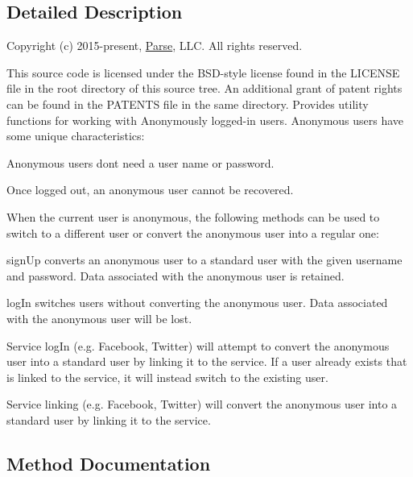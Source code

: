 \subsection{Detailed Description}
Copyright (c) 2015-\/present, \hyperlink{interface_parse}{Parse}, L\+L\+C. All rights reserved.

This source code is licensed under the B\+S\+D-\/style license found in the L\+I\+C\+E\+N\+S\+E file in the root directory of this source tree. An additional grant of patent rights can be found in the P\+A\+T\+E\+N\+T\+S file in the same directory. Provides utility functions for working with Anonymously logged-\/in users. Anonymous users have some unique characteristics\+:


\begin{DoxyItemize}
\item Anonymous users don\textquotesingle{}t need a user name or password.
\item Once logged out, an anonymous user cannot be recovered.
\item When the current user is anonymous, the following methods can be used to switch to a different user or convert the anonymous user into a regular one\+:
\item sign\+Up converts an anonymous user to a standard user with the given username and password. Data associated with the anonymous user is retained.
\item log\+In switches users without converting the anonymous user. Data associated with the anonymous user will be lost.
\item Service log\+In (e.\+g. Facebook, Twitter) will attempt to convert the anonymous user into a standard user by linking it to the service. If a user already exists that is linked to the service, it will instead switch to the existing user.
\item Service linking (e.\+g. Facebook, Twitter) will convert the anonymous user into a standard user by linking it to the service. 
\end{DoxyItemize}

\subsection{Method Documentation}
\hypertarget{interface_p_f_anonymous_utils_ad3cea449ba27bf4a535a33275fd73840}{}
